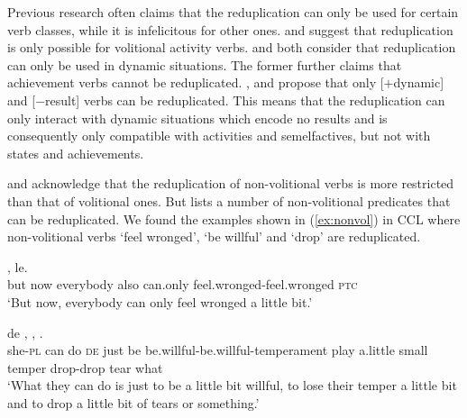 Previous research often claims that the reduplication can only be used for certain verb classes, while it is infelicitous for other ones.
 \citet[234--235]{LiThompson1981} and \citet[277--278]{Hong1999} suggest that reduplication is only possible for volitional activity verbs.
\citet[70--71]{Dai1997} and \citet[290]{Tsao2001} both consider that reduplication can only be used in dynamic situations.
The former further claims that achievement verbs cannot be reduplicated.
 \citet[155]{XiaoMcEnery2004}, \citet[20]{Arcodiaetal2014} and \citet[145]{BascianoMelloni2017} propose that only [$+$dynamic] and [$-$result] verbs can be reduplicated.
This means that the reduplication can only interact with dynamic situations which encode no results and is consequently only compatible with activities and semelfactives, but not with states and achievements.

\citet[53]{Chen2001} and \citet[10--11]{Yang2003} acknowledge that the reduplication of non\hyp{}vo\-li\-tion\-al verbs is more restricted than that of volitional ones.
But \citet[381--382]{Zhu1998} lists a number of non\hyp{}volitional predicates that can be reduplicated.
We found the examples shown in (\ref{ex:nonvol}) in {CCL} where non\nobreakdash-vo\-li\-tion\-al verbs  `feel wronged',  `be willful' and  `drop' are reduplicated.

\settowidth{}

\begin{sloppypar}
\ea\label{ex:nonvol}
\ea
\gll {} ,     le.\\
but now  everybody also can.only feel.wronged-feel.wronged \textsc{ptc}\\ 
\glt `But now, everybody can only feel wronged a little bit.'

\ex
\gll {}   de   ,    ,   .\\
she-\textsc{pl} can do \textsc{de} just be be.willful-be.willful-temperament play a.little small temper drop-drop tear what \\ 
\glt `What they can do is just to be a little bit willful, to lose their temper a little bit and to drop a little bit of tears or something.'
\z
\z
\end{sloppypar}

